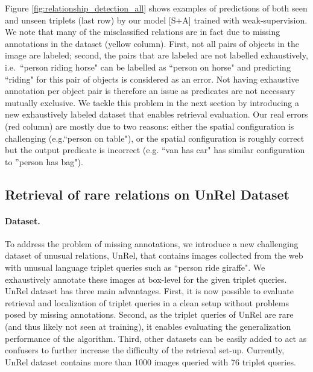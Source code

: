 \documentclass[10pt,twocolumn,letterpaper]{article}
\newcommand{\spaceparagraph}{\vspace{-.35cm}}
\newcommand{\gotoline}{\vspace{.05cm}}
\begin{document}
\gotoline
Figure \ref{fig:relationship_detection_all} shows examples of predictions  of both seen and unseen triplets (last row) by our model [S+A] trained with weak-supervision. We note that many of the misclassified relations are in fact due to missing annotations in the dataset (yellow column). First, not all pairs of objects in the image are labeled; second, the pairs that are labeled are not labelled exhaustively, i.e.\ ``person riding horse" can be labelled as ``person on horse" and predicting ``riding" for this pair of objects is considered as an error. Not having exhaustive annotation per object pair is therefore an issue as predicates are not necessary mutually exclusive. We tackle this problem in the next section by introducing a new exhaustively labeled dataset that enables retrieval evaluation. Our real errors (red column) are mostly due to two reasons: either the spatial configuration is challenging (e.g.``person on table"), or the spatial configuration is roughly correct  but the output predicate is incorrect (e.g. ``van has car" has similar configuration to ''person has bag"). 


\subsection{Retrieval of rare relations on UnRel Dataset}


\paragraph{Dataset.} To address the problem of missing annotations, we introduce a new challenging dataset of unusual relations, UnRel, that contains images collected from the web with unusual language triplet queries such as ``person ride giraffe". We exhaustively annotate these images at box-level for the given triplet queries. 
UnRel dataset has three main advantages. First, it is now possible to evaluate retrieval and localization of triplet queries in a clean setup without problems posed by missing annotations. Second, as the triplet queries of UnRel are rare (and thus likely not seen at training), it enables evaluating the generalization performance of the algorithm. Third, other datasets can be easily added to act as confusers to further increase the difficulty of the retrieval set-up. 
Currently, UnRel dataset contains more than 1000 images queried with 76 triplet queries.

\spaceparagraph
\end{document}
